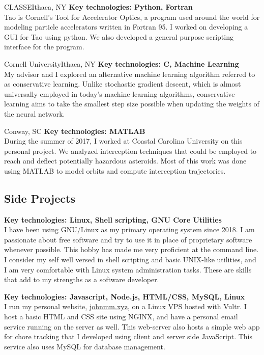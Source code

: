 \documentclass[11pt,a4paper,sans]{moderncv}        %
\newcommand{\techlist}[1]{\textbf{Key technologies: {#1}}\\}
\begin{document}
{}{CLASSE}{Ithaca, NY}{
\techlist{Python, Fortran}
\hspace*{1em}
Tao is Cornell's Tool for Accelerator Optics, a program used around the world for modeling particle accelerators written in Fortran 95.
I worked on developing a GUI for Tao using python.
We also developed a general purpose scripting interface for the program.
}%

{}{Cornell University}{Ithaca, NY}{
\techlist{C, Machine Learning}
\hspace*{1em}
My advisor and I explored an alternative machine learning algorithm referred to as conservative learning.
Unlike stochastic gradient descent, which is almost universally employed in today's machine learning algorithms, conservative learning aims to take the smallest step size possible when updating the weights of the neural network.
}%

{}
{Conway, SC}{}{
\techlist{MATLAB}
\hspace*{1em}
During the summer of 2017, I worked at Coastal Carolina University on this personal project.
We analyzed interception techniques that could be employed to reach and deflect potentially hazardous asteroids.
Most of this work was done using MATLAB to model orbits and compute interception trajectories.
}%

\subsection{Side Projects}

{}{}{}{
\techlist{Linux, Shell scripting, GNU Core Utilities}
\hspace*{1em}
I have been using GNU/Linux as my primary operating system since 2018.
I am passionate about free software and try to use it in place of proprietary software whenever possible.
This hobby has made me very proficient at the command line.
I consider my self well versed in shell scripting and basic UNIX-like utilities, and I am very comfortable with Linux system administration tasks.
These are skills that add to my strengths as a software developer.
}%

{}{}{}{
\techlist{Javascript, Node.js, HTML/CSS, MySQL, Linux}
\hspace*{1em}
I run my personal website, \url{johnmm.xyz}, on a Linux VPS hosted with Vultr.
I host a basic HTML and CSS site using NGINX, and have a personal email service running on the server as well.
This web-server also hosts a simple web app for chore tracking that I developed using client and server side JavaScript.
This service also uses MySQL for database management.
}%
\end{document}
